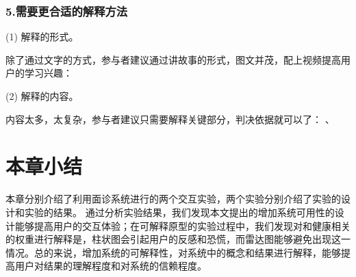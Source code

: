 \subsubsection{5.需要更合适的解释方法}
(1) 解释的形式。

除了通过文字的方式，参与者建议通过讲故事的形式，图文并茂，配上视频提高用户的学习兴趣：

(2) 解释的内容。

内容太多，太复杂，参与者建议只需要解释关键部分，判决依据就可以了：
、



\section{本章小结}

本章分别介绍了利用面诊系统进行的两个交互实验，两个实验分别介绍了实验的设计和实验的结果。
通过分析实验结果，我们发现本文提出的增加系统可用性的设计能够提高用户的交互体验；在可解释原型的实验过程中，我们发现对和健康相关的权重进行解释是，柱状图会引起用户的反感和恐慌，而雷达图能够避免出现这一情况。总的来说，增加系统的可解释性，对系统中的概念和结果进行解释，能够提高用户对结果的理解程度和对系统的信赖程度。


